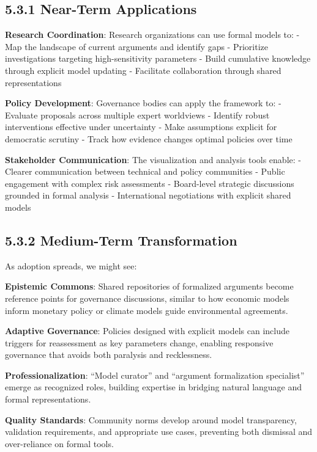 \documentclass[
  11pt,
  letterpaper,
]{book}
\begin{document}
\subsection*{5.3.1 Near-Term
Applications}\label{sec-near-term-applications}

\textbf{Research Coordination}: Research organizations can use formal
models to: - Map the landscape of current arguments and identify gaps -
Prioritize investigations targeting high-sensitivity parameters - Build
cumulative knowledge through explicit model updating - Facilitate
collaboration through shared representations

\textbf{Policy Development}: Governance bodies can apply the framework
to: - Evaluate proposals across multiple expert worldviews - Identify
robust interventions effective under uncertainty - Make assumptions
explicit for democratic scrutiny - Track how evidence changes optimal
policies over time

\textbf{Stakeholder Communication}: The visualization and analysis tools
enable: - Clearer communication between technical and policy communities
- Public engagement with complex risk assessments - Board-level
strategic discussions grounded in formal analysis - International
negotiations with explicit shared models

\subsection*{5.3.2 Medium-Term Transformation}\label{sec-medium-term}

As adoption spreads, we might see:

\textbf{Epistemic Commons}: Shared repositories of formalized arguments
become reference points for governance discussions, similar to how
economic models inform monetary policy or climate models guide
environmental agreements.

\textbf{Adaptive Governance}: Policies designed with explicit models can
include triggers for reassessment as key parameters change, enabling
responsive governance that avoids both paralysis and recklessness.

\textbf{Professionalization}: ``Model curator'' and ``argument
formalization specialist'' emerge as recognized roles, building
expertise in bridging natural language and formal representations.

\textbf{Quality Standards}: Community norms develop around model
transparency, validation requirements, and appropriate use cases,
preventing both dismissal and over-reliance on formal tools.
\end{document}
